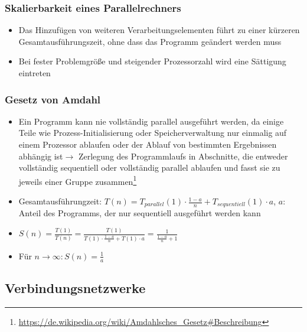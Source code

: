 \subsubsection{Skalierbarkeit eines Parallelrechners}
\begin{itemize}
	\item Das Hinzufügen von weiteren Verarbeitungselementen führt zu einer kürzeren Gesamtausführungszeit, ohne dass das Programm geändert werden muss
	\item Bei fester Problemgröße und steigender Prozessorzahl wird eine Sättigung eintreten
\end{itemize}

\subsubsection{Gesetz von Amdahl}
\begin{itemize}
	\item Ein Programm kann nie vollständig parallel ausgeführt werden, da einige Teile wie Prozess-Initialisierung oder Speicherverwaltung nur einmalig auf einem Prozessor ablaufen oder der Ablauf von bestimmten Ergebnissen abhängig ist\(\rightarrow\) Zerlegung des Programmlaufs in Abschnitte, die entweder vollständig sequentiell oder vollständig parallel ablaufen und fasst sie zu jeweils einer Gruppe zusammen\footnote{\url{https://de.wikipedia.org/wiki/Amdahlsches_Gesetz\#Beschreibung}}
	\item Gesamtausführungzeit: \(T(n) = T_{parallel}(1) \cdot \frac{1-a}{n} + T_{sequentiell}(1) \cdot a\), \(a\): Anteil des Programms, der nur sequentiell ausgeführt werden kann
	\item \(S(n) = \frac{T(1)}{T(n)} = \frac{T(1)}{T(1) \cdot \frac{1-a}{n}+T(1) \cdot a} = \frac{1}{\frac{1-a}{n}+1}\)
	\item Für \(n \rightarrow \infty:S(n)=\frac{1}{a}\)
\end{itemize}


\subsection{Verbindungsnetzwerke}

